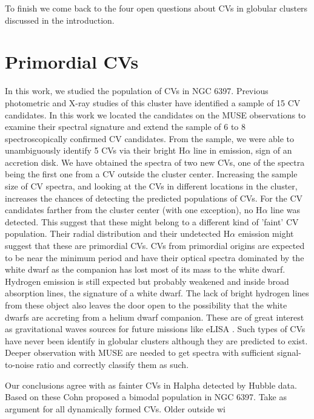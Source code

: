 To finish we come back to the four open questions about CVs in globular clusters discussed in the introduction. 


\section{Primordial CVs}

In this work, we studied the population of CVs in NGC 6397. Previous photometric and X-ray studies of this cluster have identified a sample of 15 CV candidates. In this work we located the candidates on the MUSE observations to examine their spectral signature and extend the sample of 6 to 8 spectroscopically confirmed CV candidates. From the sample, we were able to unambiguously identify 5 CVs via their bright H$\alpha$ line in emission, sign of an accretion disk. We have obtained the spectra of two new CVs, one of the spectra being the first one from a CV outside the cluster center. Increasing the sample size of CV spectra, and looking at the CVs in different locations in the cluster, increases the chances of detecting the predicted populations of CVs. For the CV candidates farther from the cluster center (with one exception), no H$\alpha$ line was detected. This suggest that these might belong to a different kind of 'faint' CV population. Their radial distribution and their undetected H$\alpha$ emission might suggest that these are primordial CVs. CVs from primordial origins are expected to be near the minimum period and have their optical spectra dominated by the white dwarf as the companion has lost most of its mass to the white dwarf. Hydrogen emission is still expected but probably weakened and inside broad absorption lines, the signature of a white dwarf. The lack of bright hydrogen lines from these object also leaves the door open to the possibility that the white dwarfs are accreting from a helium dwarf companion. These are of great interest as gravitational waves sources for future missions like eLISA \citep{elisa2012}. Such types of CVs have never been identify in globular clusters although they are predicted to exist. Deeper observation with MUSE are needed to get spectra with sufficient signal-to-noise ratio and correctly classify them as such. 

Our conclusions agree with  as fainter CVs in Halpha detected by Hubble data. Based on these Cohn proposed a bimodal population in NGC 6397. Take as argument for all dynamically formed CVs. Older outside wi



